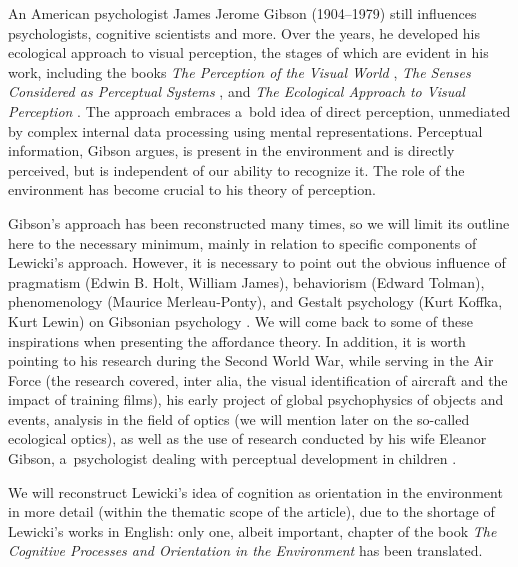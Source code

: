 \documentclass[%
manuscript=article,
year=2024,
volume=77,
doi=10.59203/zfn.77.693,
]{zfn}
\begin{document}
An American psychologist James Jerome Gibson (1904–1979) still influences psychologists, cognitive scientists and more. Over the years, he developed his ecological approach to visual perception, the stages of which are evident in his work, including the books \textit{The Perception of the Visual World}
\parencite*[][]{gibson_perception_1950},
\textit{The Senses Considered as Perceptual Systems}
\parencite*[][]{gibson_senses_1966},
and \textit{The Ecological Approach to Visual Perception} 
\parencite*[][]{gibson_ecological_1979}. %
 The approach embraces a~bold idea of direct perception, unmediated by complex internal data processing using mental representations. Perceptual information, Gibson argues, is present in the environment and is directly perceived, but is independent of our ability to recognize it. The role of the environment has become crucial to his theory of perception.



Gibson's approach has been reconstructed many times, so we will limit its outline here to the necessary minimum, mainly in relation to specific components of Lewicki's approach. However, it is necessary to point out the obvious influence of pragmatism (Edwin B. Holt, William James), behaviorism (Edward Tolman), phenomenology (Maurice Merleau-Ponty), and Gestalt psychology (Kurt Koffka, Kurt Lewin) on Gibsonian psychology 
\parencite[see][]{lobo_history_2018}. %
 We will come back to some of these inspirations when presenting the affordance theory. In addition, it is worth pointing to his research during the Second World War, while serving in the Air Force (the research covered, inter alia, the visual identification of aircraft and the impact of training films), his early project of global psychophysics of objects and events, analysis in the field of optics (we will mention later on the so-called ecological optics), as well as the use of research conducted by his wife Eleanor Gibson, a~psychologist dealing with perceptual development in children 
\parencites[][]{gibson_principles_1969}[][]{hochberg_james_1994}[][]{heft_ecological_2001}[][]{lobo_history_2018}.%




We will reconstruct Lewicki's idea of cognition as orientation in the environment in more detail (within the thematic scope of the article), due to the shortage of Lewicki's works in English: only one, albeit important, chapter of the book \textit{The Cognitive Processes and Orientation in the Environment} 
\parencite*[][]{lewicki_cognition_2016} %
 has been translated.
\end{document}
